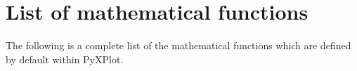 %
%
%
%
%



\chapter{List of mathematical functions}
\label{ch:function_list}

The following is a complete list of the mathematical functions which are defined by default within PyXPlot.

\newcommand{\funcdef}[2]{
\vspace{5mm}
\begin{samepage}
\noindent
{\large \bf #1}
\newline
\indfun{#1}
The #1 function #2
\end{samepage}

}


